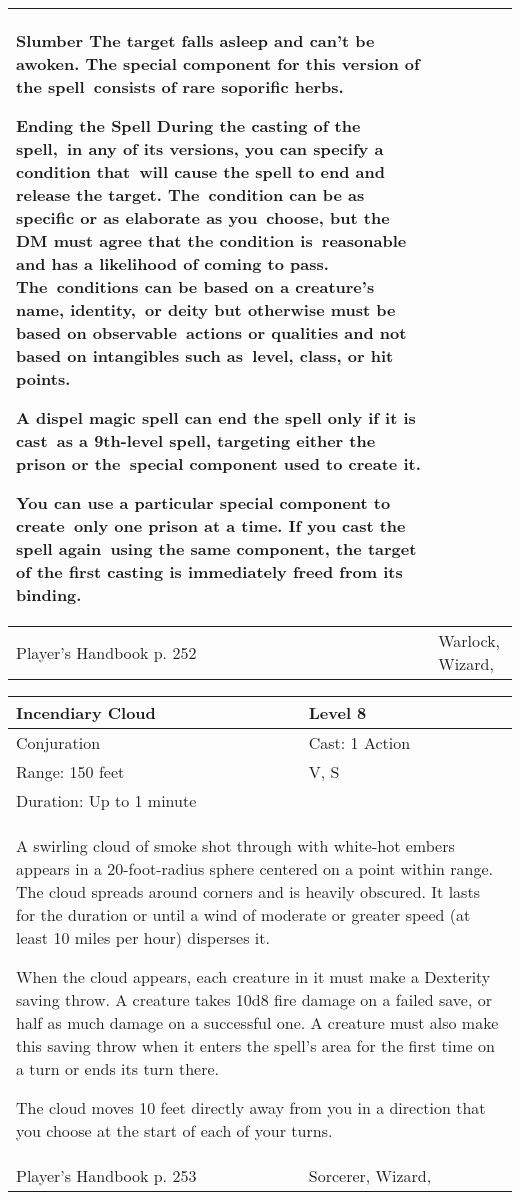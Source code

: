 \documentclass[11pt]{report}
\begin{document}
\begin{table}[H]
\begin{tabular}{||p{6cm}|p{6cm}||}
{Slumber
The target falls asleep and can’t be awoken.
The special component for this version of the spell consists of rare soporific herbs. 

Ending the Spell
During the casting of the spell, in any of its versions, you can specify a condition that will cause the spell to end and release the target. The condition can be as specific or as elaborate as you choose, but the DM must agree that the condition is reasonable and has a likelihood of coming to pass. The conditions can be based on a creature’s name, identity, or deity but otherwise must be based on observable actions or qualities and not based on intangibles such as level, class, or hit points.

A dispel magic spell can end the spell only if it is cast as a 9th-level spell, targeting either the prison or the special component used to create it.

You can use a particular special component to create only one prison at a time. If you cast the spell again using the same component, the target of the first casting is immediately freed from its binding.}\\ \hline
Player's Handbook p. 252 & Warlock, Wizard, \\ \hline\hline
	\end{tabular}
\end{table}

\begin{table}[H]
	\begin{tabular}{||p{6cm}|p{6cm}||}
		\hline\hline
		\bf{Incendiary Cloud} & Level 8\\ \hline
		Conjuration & Cast: 1 Action\\ \hline
		Range: 150 feet & V, S\\ \hline
		Duration: Up to 1 minute & \\ \hline
		\multicolumn{2}{||p{12cm}||}{A swirling cloud of smoke shot through with white-hot embers appears in a 20-foot-radius sphere centered on a point within range.
The cloud spreads around corners and is heavily obscured. It lasts for the duration or until a wind of moderate or greater speed (at least 10 miles per hour) disperses it.

When the cloud appears, each creature in it must make a Dexterity saving throw. A creature takes 10d8 fire damage on a failed save, or half as much damage on a successful one. A creature must also make this saving throw when it enters the spell’s area for the first time on a turn or ends its turn there.

The cloud moves 10 feet directly away from you in a direction that you choose at the start of each of your turns.}\\ \hline
Player's Handbook p. 253 & Sorcerer, Wizard, \\ \hline\hline
	\end{tabular}
\end{table}
\end{document}
